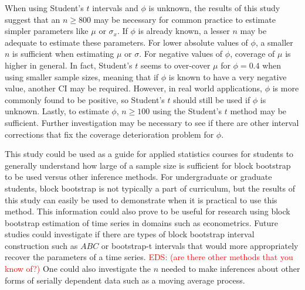 \documentclass[12pt, letterpaper, titlepage]{article}
\newcommand{\eds}[1]{\textcolor{red}{EDS: (#1)}}
\begin{document}
When using Student's $t$ intervals and $\phi$ is
unknown, the results of this study suggest that an $n \geq 800$ may be
necessary for common practice to estimate simpler parameters like $\mu$ 
or $\sigma_x$. If $\phi$ is already known, a lesser $n$ may be adequate
to
estimate these parameters. For lower absolute values of $\phi$, a smaller
$n$ is sufficient when estimating $\mu$ or $\sigma$. For negative
values of $\phi$, coverage of $\mu$ is higher in general. In fact, 
Student's $t$ seems to over-cover $\mu$ for $\phi = 0.4$ when using smaller
sample sizes, 
meaning that if $\phi$ is known to have a very negative value, another CI
may be required.
However, in real world applications, $\phi$ is
more commonly found to be positive, so Student's $t$ should still be used
if $\phi$ is unknown.
Lastly, to estimate $\phi$, $n \geq 100$ using the 
Student's $t$ method
 may be sufficient.
Further investigation may be necessary to see if there are other interval
corrections that fix the coverage deterioration problem for $\phi$.

This study could be used as a guide for applied statistics courses for students
to generally understand how large of a sample size is sufficient for block
bootstrap to be used versus other inference methods. For undergraduate or
graduate students, block bootstrap is not typically a part of curriculum, but the 
results of this study can easily be used to demonstrate when it is practical to use 
this method.
This information could also prove to be useful for research using block
bootstrap
estimation of time series in domains such as econometrics. Future studies
could investigate if there are types of block bootstrap interval
construction such as $ABC$ or bootstrap-t intervals
that would more appropriately recover the parameters of a time
series. \eds{are there other methods that you know of?} 
One could also investigate the $n$ needed to make inferences about
other forms of serially dependent data such as a moving average process. 



\end{document}
